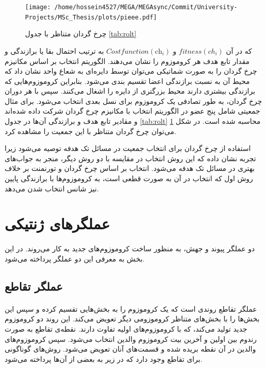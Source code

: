 \documentclass[a4paper,titlepage,12pt,fleqn,oneside]{report}
\begin{document}
	\begin{figure}[h!]
		\centering
		\texttt{[image: /home/hossein4527/MEGA/MEGAsync/Commit/University-Projects/MSc\_Thesis/plots/pieee.pdf]}
		\caption{چرخ گردان متناظر با جدول \ref{tab:rolt}}
		\label{fig:pieee}
	\end{figure}
	که در آن $fitness\left(c h_{i}\right)$ و $Cost{}function\left(\mathrm{ch}_{i}\right)$ به ترتیب احتمال بقا یا برازندگی و مقدار تابع هدف هر کروموزوم را نشان می‌دهند.
	الگوریتم انتخاب بر اساس مکانیزم چرخ گردان را به صورت شماتیکی می‌توان توسط دایره‌ای به شعاع واحد نشان داد که محیط آن به نسبت برازندگی اعضا تقسیم بندی می‌شود. بنابر‌این کروموزوم‌ها‌یی که برازندگی بیشتری دارند محیط بزرگتری از دایره را اشغال می‌کنند. سپس با هر دوران چرخ گردان، به طور تصادفی یک کروموزوم برای نسل بعدی انتخاب می‌شود. برای مثال جمعیتی شامل پنج عضو در الگوریتم انتخاب با مکانیزم چرخ گردان شرکت داده شده‌ا‌ند و مقادیر تابع هدف و برازندگی آن‌ها در جدول \ref{tab:rolt} محاسبه شده است. در شکل \ref{fig:pieee} می‌توان چرخ گردان متناظر با این جمعیت را مشاهده کرد.
	
	استفاده از چرخ گردان برای انتخاب جمعیت در مسائل تک هدفه توصیه می‌شود زیرا تجربه نشان داده که این روش انتخاب در مقایسه با دو روش دیگر، منجر به جواب‌های بهتری در مسائل تک هدفه می‌شود. انتخاب بر اساس چرخ گردان و تورنمنت بر خلاف روش اول که انتخاب در آن به صورت قطعی است، به کروموزوم‌ها با برازندگی پایین نیز شانس انتخاب شدن می‌دهد.
	\section{عملگرهای ژنتیکی}
	\paragraph{}
	دو عملگر پیوند و جهش، به منظور ساخت کروموزوم‌های جدید به کار می‌روند. در این بخش به معرفی این دو عملگر پرداخته می‌شود.
	\subsection{عملگر تقاطع}
	\paragraph{}
	عملگر تقاطع روندی است که یک کروموزوم را به بخش‌ها‌یی تقسیم کرده و سپس این بخش‌ها را با بخش‌های متناظر کروموزومی دیگر تعویض می‌کند. این روند دو کروموزوم جدید تولید می‌کند، که با کروموزوم‌های اولیه تفاوت دارند. نقطه‌ی تقاطع به صورت رندوم بین اولین و آخرین بیت کروموزوم والدین انتخاب می‌شود. سپس کروموزوم‌های والدین در آن نقطه بریده شده و قسمت‌های آنان تعویض می‌شود. روش‌های گوناگونی برای تقاطع وجود دارد که در زیر به بعضی از آن‌ها پرداخته می‌شود.
\end{document}
